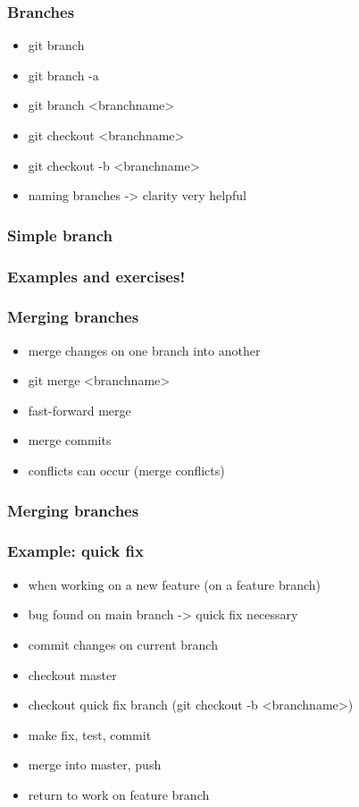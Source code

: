 \begin{frame}
\frametitle{Branches}
\begin{itemize}
    \item git branch
    \item git branch -a
    \item git branch <branchname>
    \item git checkout <branchname>
    \item git checkout -b <branchname>
    \item naming branches -> clarity very helpful
\end{itemize}
\end{frame}

\begin{frame}
\frametitle{Simple branch}
\begin{center}
    \resizebox{!}{0.7\textheight}{%
        
    }
\end{center}
\end{frame}

\begin{frame}
\frametitle{Examples and exercises!}
\end{frame}

\begin{frame}
\frametitle{Merging branches}
\begin{itemize}
    \item merge changes on one branch into another
    \item git merge <branchname>
    \item fast-forward merge
    \item merge commits
    \item conflicts can occur (merge conflicts)
\end{itemize}
\end{frame}

\begin{frame}
\frametitle{Merging branches}
\begin{center}
    \resizebox{!}{0.7\textheight}{%
        
    }
\end{center}
\end{frame}

\begin{frame}
\frametitle{Example: quick fix}
\begin{itemize}
    \item when working on a new feature (on a feature branch)
    \item bug found on main branch -> quick fix necessary
    \item commit changes on current branch
    \item checkout master
    \item checkout quick fix branch (git checkout -b <branchname>)
    \item make fix, test, commit
    \item merge into master, push
    \item return to work on feature branch
\end{itemize}
\end{frame}

